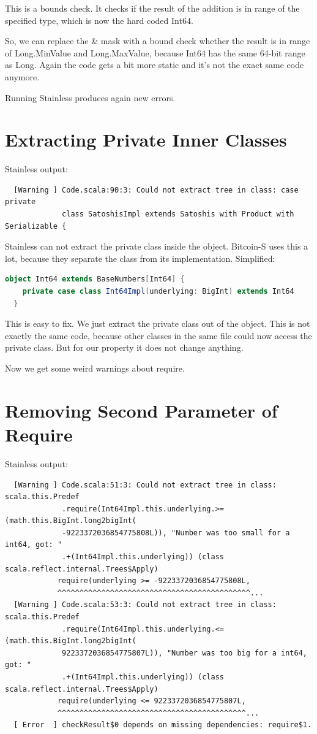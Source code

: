 This is a bounds check.
It checks if the result of the addition is in range of the specified type, which is now the hard coded Int64.

So, we can replace the \& mask with a bound check whether the result is in range of Long.MinValue and Long.MaxValue, because Int64 has the same 64-bit range as Long.
Again the code gets a bit more static and it's not the exact same code anymore.

Running Stainless produces again new errors.


\section{Extracting Private Inner Classes}

Stainless output:
{\footnotesize\begin{verbatim}
  [Warning ] Code.scala:90:3: Could not extract tree in class: case private
             class SatoshisImpl extends Satoshis with Product with Serializable {
\end{verbatim}}

Stainless can not extract the private class inside the object.
Bitcoin-S uses this a lot, because they separate the class from its implementation.
Simplified:
\begin{lstlisting}[language=scala]
  object Int64 extends BaseNumbers[Int64] {
    private case class Int64Impl(underlying: BigInt) extends Int64 
  }
\end{lstlisting}

This is easy to fix.
We just extract the private class out of the object.
This is not exactly the same code, because other classes in the same file could now access the private class.
But for our property it does not change anything.

Now we get some weird warnings about require.


\section{Removing Second Parameter of Require}

Stainless output:
{\footnotesize\begin{verbatim}
  [Warning ] Code.scala:51:3: Could not extract tree in class: scala.this.Predef
             .require(Int64Impl.this.underlying.>=(math.this.BigInt.long2bigInt(
             -9223372036854775808L)), "Number was too small for a int64, got: "
             .+(Int64Impl.this.underlying)) (class scala.reflect.internal.Trees$Apply)
            require(underlying >= -9223372036854775808L,
            ^^^^^^^^^^^^^^^^^^^^^^^^^^^^^^^^^^^^^^^^^^^^...
  [Warning ] Code.scala:53:3: Could not extract tree in class: scala.this.Predef
             .require(Int64Impl.this.underlying.<=(math.this.BigInt.long2bigInt(
             9223372036854775807L)), "Number was too big for a int64, got: "
             .+(Int64Impl.this.underlying)) (class scala.reflect.internal.Trees$Apply)
            require(underlying <= 9223372036854775807L,
            ^^^^^^^^^^^^^^^^^^^^^^^^^^^^^^^^^^^^^^^^^^^...
  [ Error  ] checkResult$0 depends on missing dependencies: require$1.
\end{verbatim}}

